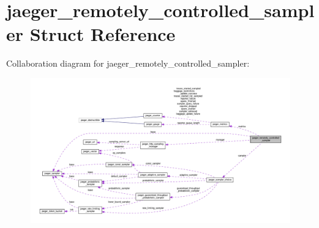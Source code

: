 \hypertarget{structjaeger__remotely__controlled__sampler}{}\section{jaeger\+\_\+remotely\+\_\+controlled\+\_\+sampler Struct Reference}
\label{structjaeger__remotely__controlled__sampler}


Collaboration diagram for jaeger\+\_\+remotely\+\_\+controlled\+\_\+sampler\+:\nopagebreak
\begin{figure}[H]
\begin{center}
\leavevmode
\includegraphics[width=350pt]{structjaeger__remotely__controlled__sampler__coll__graph}
\end{center}
\end{figure}
